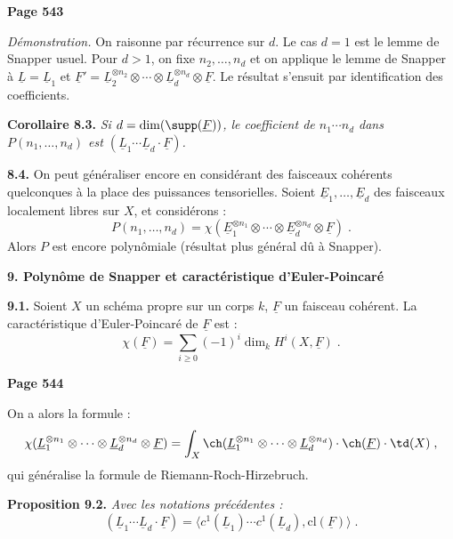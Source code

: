\newpage
\noindent\textbf{Page 543}

\textit{D\'emonstration.} On raisonne par r\'ecurrence sur $d$. Le cas $d = 1$ est le lemme de Snapper usuel. Pour $d > 1$, on fixe $n_2, \ldots, n_d$ et on applique le lemme de Snapper \`a $\underline{L} = \underline{L}_1$ et $\underline{F}' = \underline{L}_2^{\otimes n_2} \otimes \cdots \otimes \underline{L}_d^{\otimes n_d} \otimes \underline{F}$. Le r\'esultat s'ensuit par identification des coefficients.

\smallskip
\noindent\textbf{Corollaire 8.3.} \textit{Si $d = \dim(\supp(\underline{F}))$, le coefficient de $n_1 \cdots n_d$ dans $P(n_1, \ldots, n_d)$ est $(\underline{L}_1 \cdots \underline{L}_d \cdot \underline{F})$.}

\smallskip
\noindent\textbf{8.4.} On peut g\'en\'eraliser encore en consid\'erant des faisceaux coh\'erents quelconques \`a la place des puissances tensorielles. Soient $\underline{E}_1, \ldots, \underline{E}_d$ des faisceaux localement libres sur $X$, et consid\'erons :
\[
P(n_1, \ldots, n_d) = \chi(\underline{E}_1^{\otimes n_1} \otimes \cdots \otimes \underline{E}_d^{\otimes n_d} \otimes \underline{F})\;.
\]
Alors $P$ est encore polyn\^omiale (r\'esultat plus g\'en\'eral d\^u \`a Snapper).

\medskip
\noindent\textbf{9. Polyn\^ome de Snapper et caract\'eristique d'Euler-Poincar\'e}

\smallskip
\noindent\textbf{9.1.} Soient $X$ un sch\'ema propre sur un corps $k$, $\underline{F}$ un faisceau coh\'erent. La caract\'eristique d'Euler-Poincar\'e de $\underline{F}$ est :
\[
\chi(\underline{F}) = \sum_{i \geq 0} (-1)^i \dim_k H^i(X, \underline{F})\;.
\]

\newpage
\noindent\textbf{Page 544}

On a alors la formule :
\[
\chi(\underline{L}_1^{\otimes n_1} \otimes \cdots \otimes \underline{L}_d^{\otimes n_d} \otimes \underline{F}) = \int_X \ch(\underline{L}_1^{\otimes n_1} \otimes \cdots \otimes \underline{L}_d^{\otimes n_d}) \cdot \ch(\underline{F}) \cdot \td(X)\;,
\]
qui g\'en\'eralise la formule de Riemann-Roch-Hirzebruch.

\smallskip
\noindent\textbf{Proposition 9.2.} \textit{Avec les notations pr\'ec\'edentes :
\[
(\underline{L}_1 \cdots \underline{L}_d \cdot \underline{F}) = \langle c^1(\underline{L}_1) \cdots c^1(\underline{L}_d), \mathrm{cl}(\underline{F}) \rangle\;.
\]}

